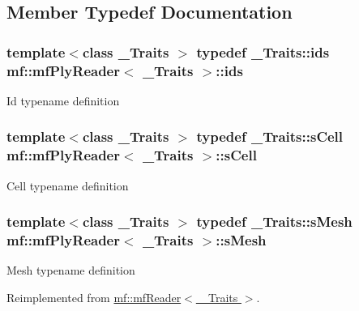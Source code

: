 \subsection{Member Typedef Documentation}
\hypertarget{classmf_1_1mfPlyReader_a74dd0c085b152407ff3b92ba7bc672e5}{
\subsubsection[{ids}]{\setlength{\rightskip}{0pt plus 5cm}template$<$class \_\-Traits $>$ typedef \_\-Traits::ids {\bf mf::mfPlyReader}$<$ \_\-Traits $>$::{\bf ids}}}
\label{classmf_1_1mfPlyReader_a74dd0c085b152407ff3b92ba7bc672e5}
Id typename definition \hypertarget{classmf_1_1mfPlyReader_a4ecabd9e906019c1aac0133077fa2409}{
\subsubsection[{sCell}]{\setlength{\rightskip}{0pt plus 5cm}template$<$class \_\-Traits $>$ typedef \_\-Traits::sCell {\bf mf::mfPlyReader}$<$ \_\-Traits $>$::{\bf sCell}}}
\label{classmf_1_1mfPlyReader_a4ecabd9e906019c1aac0133077fa2409}
Cell typename definition \hypertarget{classmf_1_1mfPlyReader_ac1d8f2f32769b5966ac4da1d1c8ee66b}{
\subsubsection[{sMesh}]{\setlength{\rightskip}{0pt plus 5cm}template$<$class \_\-Traits $>$ typedef \_\-Traits::sMesh {\bf mf::mfPlyReader}$<$ \_\-Traits $>$::{\bf sMesh}}}
\label{classmf_1_1mfPlyReader_ac1d8f2f32769b5966ac4da1d1c8ee66b}
Mesh typename definition 

Reimplemented from \hyperlink{classmf_1_1mfReader}{mf::mfReader$<$ \_\-Traits $>$}.

